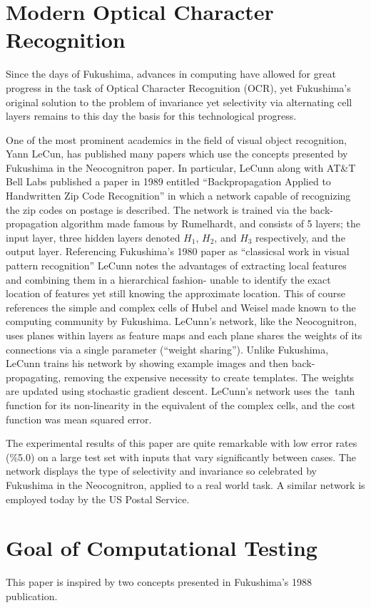 \documentclass[12pt]{article}
\begin{document}
\section{Modern Optical Character Recognition}
Since the days of Fukushima, advances in computing have allowed for great progress in the task of Optical Character Recognition (OCR), yet Fukushima's original solution to the problem of invariance yet selectivity via alternating cell layers remains to this day the basis for this technological progress.

One of the most prominent academics in the field of visual object recognition, Yann LeCun, has published many papers which use the concepts presented by Fukushima in the Neocognitron paper. In particular, LeCunn along with AT\&T Bell Labs published a paper in 1989 entitled ``Backpropagation Applied to Handwritten Zip Code Recognition'' in which a network capable of recognizing the zip codes on postage is described. The network is trained via the back-propagation algorithm made famous by Rumelhardt, and consists of 5 layers; the input layer, three hidden layers denoted $H_1$, $H_2$, and $H_3$ respectively, and the output layer. Referencing Fukushima's 1980 paper as ``classicsal work in visual pattern recognition'' LeCunn notes the advantages of extracting local features and combining them in a hierarchical fashion- unable to identify the exact location of features yet still knowing the approximate location. This of course references the simple and complex cells of Hubel and Weisel made known to the computing community by Fukushima. LeCunn's network, like the Neocognitron, uses planes within layers as feature maps and each plane shares the weights of its connections via a single parameter (``weight sharing''). Unlike Fukushima, LeCunn trains his network by showing example images and then back-propagating, removing the expensive necessity to create templates. The weights are updated using stochastic gradient descent. LeCunn's network uses the $\tanh$ function for its non-linearity in the equivalent of the complex cells, and the cost function was mean squared error.  

The experimental results of this paper are quite remarkable with low error rates (\%5.0) on a large test set with inputs that vary significantly between cases. The network displays the type of selectivity and invariance so celebrated by Fukushima in the Neocognitron, applied to a real world task. A similar network is employed today by the US Postal Service. 

\section{Goal of Computational Testing}
This paper is inspired by two concepts presented in Fukushima's 1988 publication. 
\end{document}
